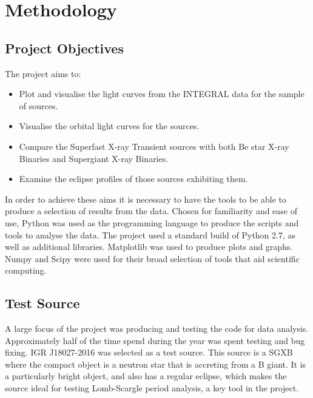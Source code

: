 
\chapter{Methodology} %

\label{ch:method} %

\section{Project Objectives}
The project aims to:
\begin{itemize}
\item Plot and visualise the light curves from the INTEGRAL data for the sample of sources.
\item Visualise the orbital light curves for the sources.
\item Compare the Superfast X-ray Transient sources with both Be star X-ray Binaries and Supergiant X-ray Binaries. 
\item Examine the eclipse profiles of those sources exhibiting them.
\end{itemize}
In order to achieve these aims it is necessary to have the tools to be able to produce a selection of results from the data. Chosen for familiarity and ease of use, Python was used as the programming language to produce the scripts and tools to analyse the data. The project used a standard build of Python 2.7, as well as additional libraries. Matplotlib was used to produce plots and graphs. Numpy and Scipy were used for their broad selection of tools that aid scientific computing.

\section{Test Source}
A large focus of the project was producing and testing the code for data analysis. Approximately half of the time spend during the year was spent testing and bug fixing. IGR J18027-2016 was selected as a test source. This source is a SGXB where the compact object is a neutron star that is accreting from a B giant. It is a particularly bright object, and also has a regular eclipse, which makes the source ideal for testing Lomb-Scargle period analysis, a key tool in the project. 

